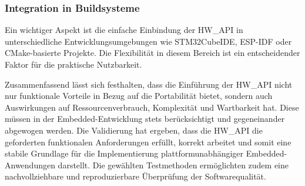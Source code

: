 \subsubsection{Integration in Buildsysteme}
Ein wichtiger Aspekt ist die einfache Einbindung der HW\_API in unterschiedliche Entwicklungsumgebungen wie STM32CubeIDE, ESP-IDF oder CMake-basierte Projekte. Die Flexibilität in diesem Bereich ist ein entscheidender Faktor für die praktische Nutzbarkeit.


Zusammenfassend lässt sich festhalten, dass die Einführung der HW\_API nicht nur funktionale Vorteile in Bezug auf die Portabilität bietet, sondern auch Auswirkungen auf Ressourcenverbrauch, Komplexität und Wartbarkeit hat. 
Diese müssen in der Embedded-Entwicklung stets berücksichtigt und gegeneinander abgewogen werden. 
Die Validierung hat ergeben, dass die HW\_API die geforderten funktionalen Anforderungen erfüllt, korrekt arbeitet und somit eine stabile Grundlage für die Implementierung plattformunabhängiger Embedded-Anwendungen darstellt. 
Die gewählten Testmethoden ermöglichten zudem eine nachvollziehbare und reproduzierbare Überprüfung der Softwarequalität.































